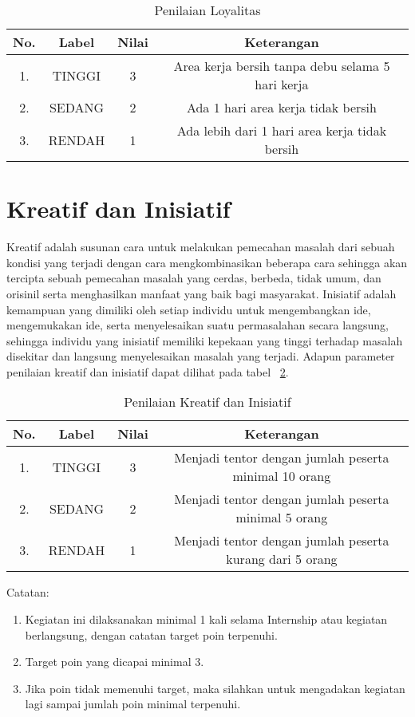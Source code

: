 \begin{table}[H]
\caption{Penilaian Loyalitas}
\centering
\begin{tabular}{|c|c|c|c|}
\hline
\textbf{No.}&\textbf{Label}&\textbf{Nilai}&\textbf{Keterangan}\\
\hline
1.&TINGGI&3&Area kerja bersih tanpa debu selama 5 hari kerja\\
\hline
2.&SEDANG&2&Ada 1 hari area kerja tidak bersih\\
\hline
3.&RENDAH&1&Ada lebih dari 1 hari area kerja tidak bersih\\
\hline
\end{tabular}
\label{table:nilailoyalitas}
\end{table}

\section{Kreatif dan Inisiatif}
Kreatif adalah susunan cara untuk melakukan pemecahan masalah dari sebuah kondisi yang terjadi dengan cara mengkombinasikan beberapa cara sehingga akan tercipta sebuah pemecahan masalah yang cerdas, berbeda, tidak umum, dan orisinil serta menghasilkan manfaat yang baik bagi masyarakat. Inisiatif adalah kemampuan yang dimiliki oleh setiap individu untuk mengembangkan ide, mengemukakan ide, serta menyelesaikan suatu permasalahan secara langsung, sehingga individu yang inisiatif memiliki kepekaan yang tinggi terhadap masalah disekitar dan langsung menyelesaikan masalah yang terjadi. Adapun parameter penilaian kreatif dan inisiatif dapat dilihat pada tabel ~\ref{table:nilaikreatifinisiatif}.

\begin{table}[H]
\caption{Penilaian Kreatif dan Inisiatif}
\centering
\begin{tabular}{|c|c|c|c|}
\hline
\textbf{No.}&\textbf{Label}&\textbf{Nilai}&\textbf{Keterangan}\\
\hline
1.&TINGGI&3&Menjadi tentor dengan jumlah peserta minimal 10 orang\\
\hline
2.&SEDANG&2&Menjadi tentor dengan jumlah peserta minimal 5 orang\\
\hline
3.&RENDAH&1&Menjadi tentor dengan jumlah peserta kurang dari 5 orang\\
\hline
\end{tabular}
\label{table:nilaikreatifinisiatif}
\end{table}

Catatan:
\begin{enumerate}
\item Kegiatan ini dilaksanakan minimal 1 kali selama Internship atau kegiatan berlangsung, dengan catatan target poin terpenuhi.
\item Target poin yang dicapai minimal 3.
\item Jika poin tidak memenuhi target, maka silahkan untuk mengadakan kegiatan lagi sampai jumlah poin minimal terpenuhi.
\end{enumerate} 